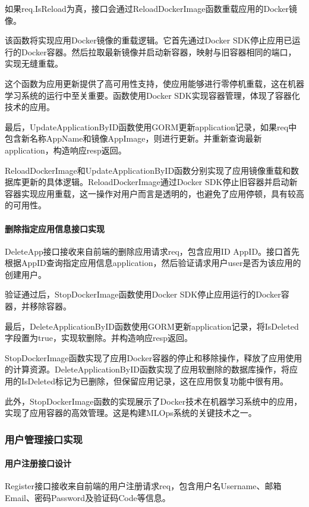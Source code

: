 \documentclass{HDU-Bachelor-Thesis}
\begin{document}
如果req.IsReload为真，接口会通过ReloadDockerImage函数重载应用的Docker镜像。

该函数将实现应用Docker镜像的重载逻辑。它首先通过Docker SDK停止应用已运行的Docker容器。然后拉取最新镜像并启动新容器，映射与旧容器相同的端口，实现无缝重载。

这个函数为应用更新提供了高可用性支持，使应用能够进行零停机重载，这在机器学习系统的运行中至关重要。函数使用Docker SDK实现容器管理，体现了容器化技术的应用。

最后，UpdateApplicationByID函数使用GORM更新application记录，如果req中包含新名称AppName和镜像AppImage，则进行更新。并重新查询最新application，构造响应resp返回。

ReloadDockerImage和UpdateApplicationByID函数分别实现了应用镜像重载和数据库更新的具体逻辑。ReloadDockerImage通过Docker SDK停止旧容器并启动新容器实现应用重载，这一操作对用户而言是透明的，也避免了应用停顿，具有较高的可用性。

\paragraph{删除指定应用信息接口实现}

DeleteApp接口接收来自前端的删除应用请求req，包含应用ID AppID。接口首先根据AppID查询指定应用信息application，然后验证请求用户user是否为该应用的创建用户。

验证通过后，StopDockerImage函数使用Docker SDK停止应用运行的Docker容器，并移除容器。

最后，DeleteApplicationByID函数使用GORM更新application记录，将IsDeleted字段置为true，实现软删除。并构造响应resp返回。

StopDockerImage函数实现了应用Docker容器的停止和移除操作，释放了应用使用的计算资源。DeleteApplicationByID函数实现了应用软删除的数据库操作，将应用的IsDeleted标记为已删除，但保留应用记录，这在应用恢复功能中很有用。

此外，StopDockerImage函数的实现展示了Docker技术在机器学习系统中的应用，实现了应用容器的高效管理。这是构建MLOps系统的关键技术之一。

\subsubsection{用户管理接口实现}
\paragraph{用户注册接口设计}

Register接口接收来自前端的用户注册请求req，包含用户名Username、邮箱Email、密码Password及验证码Code等信息。
\end{document}
